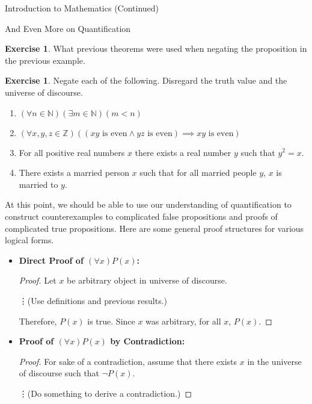 \documentclass[11pt]{article}
\theoremstyle{definition}
\newtheorem{exercise}[theorem]{Exercise}
\begin{document}
\begin{section}{Introduction to Mathematics (Continued)}
\begin{subsection}{And Even More on Quantification}
\begin{exercise}
What previous theorems were used when negating the proposition in the previous example.
\end{exercise}

\begin{exercise}
Negate each of the following.  Disregard the truth value and the universe of discourse.
\begin{enumerate}
\item $(\forall n\in\mathbb{N})(\exists m\in\mathbb{N})(m<n)$
\item $(\forall x,y,z\in\mathbb{Z})((xy \mbox{ is even}\wedge yz\mbox{ is even})\implies xy\mbox{ is even})$
\item For all positive real numbers $x$ there exists a real number $y$ such that $y^2=x$.
\item There exists a married person $x$ such that for all married people $y$, $x$ is married to $y$.
\end{enumerate}
\end{exercise}

At this point, we should be able to use our understanding of quantification to construct counterexamples to complicated false propositions and proofs of complicated true propositions.  Here are some general proof structures for various logical forms.

\begin{itemize}
\item[] \textbf{Direct Proof of $(\forall x)P(x)$:}

\begin{proof}
Let $x$ be arbitrary object in universe of discourse.  

\bigskip

\hspace{2in}\vdots \hspace{1cm}(Use definitions and previous results.)

\bigskip

\noindent Therefore, $P(x)$ is true.  Since $x$ was arbitrary, for all $x$, $P(x)$.
\end{proof}

\item[] \textbf{Proof of $(\forall x)P(x)$ by Contradiction:}

\begin{proof}
For sake of a contradiction, assume that there exists $x$ in the universe of discourse such that $\neg P(x)$.
\bigskip

\hspace{2in}\vdots \hspace{1cm}(Do something to derive a contradiction.)


\end{proof}
\end{itemize}
\end{subsection}
\end{section}
\end{document}
